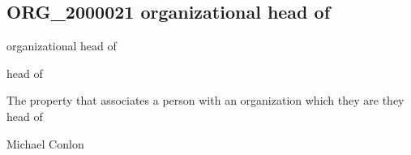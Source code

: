 \documentclass[letterpaper,10pt,english]{sphinxmanual}
\begin{document}
\subsection{ORG\_2000021 \sphinxhyphen{} organizational head of}
\label{\detokenize{doc-ORG_2000021:org-2000021-organizational-head-of}}\label{\detokenize{doc-ORG_2000021:index-0}}\label{\detokenize{doc-ORG_2000021::doc}}
\begin{sphinxShadowBox}

\sphinxAtStartPar
organizational head of
\end{sphinxShadowBox}

\begin{sphinxShadowBox}

\sphinxAtStartPar
head of
\end{sphinxShadowBox}

\begin{sphinxShadowBox}

\sphinxAtStartPar
{}
\end{sphinxShadowBox}

\begin{sphinxShadowBox}

\sphinxAtStartPar
The property that associates a person with an organization which they are they head of
\end{sphinxShadowBox}

\begin{sphinxShadowBox}

\sphinxAtStartPar
Michael Conlon 
\end{sphinxShadowBox}

\begin{sphinxShadowBox}

\sphinxAtStartPar
{\hyperref[\detokenize{doc-NCBITaxon_9606::doc}]{}}
\end{sphinxShadowBox}

\begin{sphinxShadowBox}

\sphinxAtStartPar
{\hyperref[\detokenize{doc-ORG_0000001::doc}]{}}
\end{sphinxShadowBox}
\end{document}
